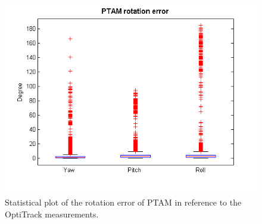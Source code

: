 \begin{figure}[h]
     \centering
     \includegraphics[width=1.0\textwidth]{img/ptam_rot_error_box.png}
     \caption{Statistical plot of the rotation error of PTAM in reference to the OptiTrack measurements.}
     \label{img:ptam_rot_error_plot}
\end{figure}